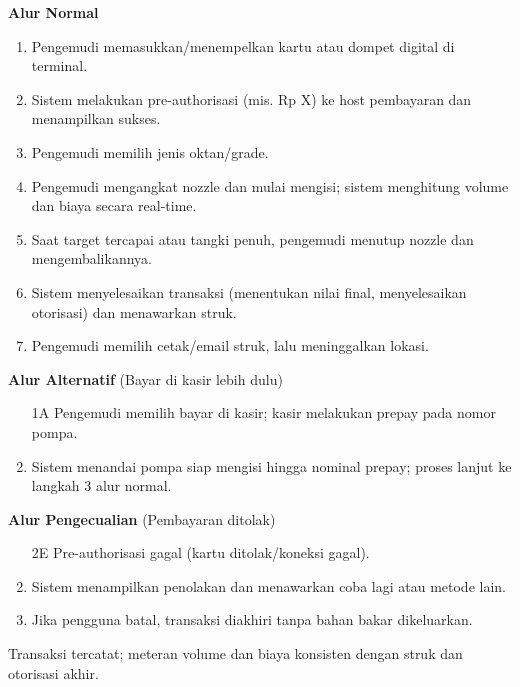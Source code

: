 \documentclass[a4paper]{article}
\begin{document}
\begin{enumerate}[itemsep=1em]
\begin{itemize}[itemsep=1em]
    \vspace{1em}

    \textbf{Alur Normal}
    \begin{enumerate}[nosep]
      \item Pengemudi memasukkan/menempelkan kartu atau dompet digital di terminal.
      \item Sistem melakukan pre-authorisasi (mis. Rp X) ke host pembayaran dan menampilkan sukses.
      \item Pengemudi memilih jenis oktan/grade.
      \item Pengemudi mengangkat nozzle dan mulai mengisi; sistem menghitung volume dan biaya secara real-time.
      \item Saat target tercapai atau tangki penuh, pengemudi menutup nozzle dan mengembalikannya.
      \item Sistem menyelesaikan transaksi (menentukan nilai final, menyelesaikan otorisasi) dan menawarkan struk.
      \item Pengemudi memilih cetak/email struk, lalu meninggalkan lokasi.
    \end{enumerate}

    \vspace{1em}

    \textbf{Alur Alternatif} (Bayar di kasir lebih dulu)
    \begin{enumerate}[nosep]
      \item[1A] Pengemudi memilih bayar di kasir; kasir melakukan prepay pada nomor pompa.
      \item Sistem menandai pompa siap mengisi hingga nominal prepay; proses lanjut ke langkah 3 alur normal.
    \end{enumerate}

    \vspace{1em}

    \textbf{Alur Pengecualian} (Pembayaran ditolak)
    \begin{enumerate}[nosep]
      \item[2E] Pre-authorisasi gagal (kartu ditolak/koneksi gagal).
      \item Sistem menampilkan penolakan dan menawarkan coba lagi atau metode lain.
      \item Jika pengguna batal, transaksi diakhiri tanpa bahan bakar dikeluarkan.
    \end{enumerate}

    \vspace{1em}

    \begin{description}[leftmargin=0.5cm, style=nextline]
      \item[Post-condition] Transaksi tercatat; meteran volume dan biaya konsisten dengan struk dan otorisasi akhir.
    \end{description}


\end{itemize}
\end{enumerate}
\end{document}
